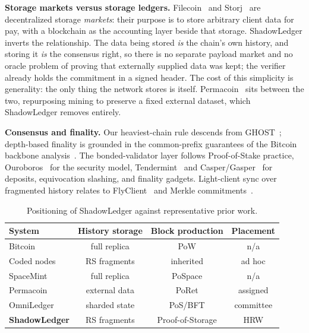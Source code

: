 \textbf{Storage markets versus storage ledgers.} Filecoin~\cite{fisch2018scaling} and
Storj~\cite{wilkinson2016storj} are decentralized storage \emph{markets}: their purpose is to store
arbitrary client data for pay, with a blockchain as the accounting layer beside that storage.
ShadowLedger inverts the relationship. The data being stored \emph{is} the chain's own history, and
storing it \emph{is} the consensus right, so there is no separate payload market and no oracle
problem of proving that externally supplied data was kept; the verifier already holds the
commitment in a signed header. The cost of this simplicity is generality: the only thing the network
stores is itself. Permacoin~\cite{miller2014permacoin} sits between the two, repurposing mining to
preserve a fixed external dataset, which ShadowLedger removes entirely.

\textbf{Consensus and finality.} Our heaviest-chain rule descends from
GHOST~\cite{sompolinsky2015ghost}; depth-based finality is grounded in the common-prefix
guarantees of the Bitcoin backbone analysis~\cite{garay2015backbone}. The bonded-validator
layer follows Proof-of-Stake practice, Ouroboros~\cite{kiayias2017ouroboros} for the security
model, Tendermint~\cite{buchman2018gossip} and Casper/Gasper~\cite{buterin2017casper,buterin2020gasper}
for deposits, equivocation slashing, and finality gadgets. Light-client sync over fragmented
history relates to FlyClient~\cite{bunz2020flyclient} and Merkle
commitments~\cite{merkle1988digsig}.

\begin{table}[t]
\centering
\caption{Positioning of ShadowLedger against representative prior work.}
\label{tab:position}
\small
\begin{tabular}{lccc}
\toprule
System & History storage & Block production & Placement \\
\midrule
Bitcoin~\cite{nakamoto2008bitcoin}        & full replica   & PoW            & n/a \\
Coded nodes~\cite{perard2018erasure}      & RS fragments   & inherited      & ad hoc \\
SpaceMint~\cite{park2018spacemint}        & full replica   & PoSpace        & n/a \\
Permacoin~\cite{miller2014permacoin}      & external data  & PoRet          & assigned \\
OmniLedger~\cite{kokoriskogias2018omniledger} & sharded state & PoS/BFT     & committee \\
\textbf{ShadowLedger}                     & RS fragments   & Proof-of-Storage & HRW \\
\bottomrule
\end{tabular}
\end{table}
